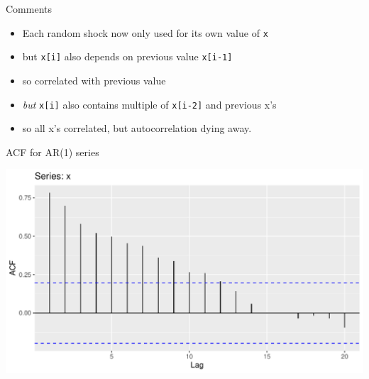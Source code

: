 \documentclass[ignorenonframetext,]{beamer}
\newenvironment{Shaded}{\begin{snugshade}}{\end{snugshade}}
\newcommand{\DataTypeTok}[1]{\textcolor[rgb]{0.13,0.29,0.53}{#1}}
\newcommand{\KeywordTok}[1]{\textcolor[rgb]{0.13,0.29,0.53}{\textbf{#1}}}
\newcommand{\NormalTok}[1]{#1}
\newcommand{\OperatorTok}[1]{\textcolor[rgb]{0.81,0.36,0.00}{\textbf{#1}}}
\newcommand{\StringTok}[1]{\textcolor[rgb]{0.31,0.60,0.02}{#1}}
\providecommand{\tightlist}{%
  \setlength{\itemsep}{0pt}\setlength{\parskip}{0pt}}
\begin{document}
\begin{frame}[fragile]{Comments}
\protect\hypertarget{comments-47}{}

\begin{itemize}
\tightlist
\item
  Each random shock now only used for its own value of \texttt{x}
\item
  but \texttt{x{[}i{]}} also depends on previous value
  \texttt{x{[}i-1{]}}
\item
  so correlated with previous value
\item
  \emph{but} \texttt{x{[}i{]}} also contains multiple of
  \texttt{x{[}i-2{]}} and previous x's
\item
  so all x's correlated, but autocorrelation dying away.
\end{itemize}

\end{frame}

\begin{frame}[fragile]{ACF for AR(1) series}
\protect\hypertarget{acf-for-ar1-series}{}

\begin{Shaded}
\end{Shaded}

\includegraphics{figure/unnamed-chunk-553-1.pdf}

\end{frame}
\end{document}
